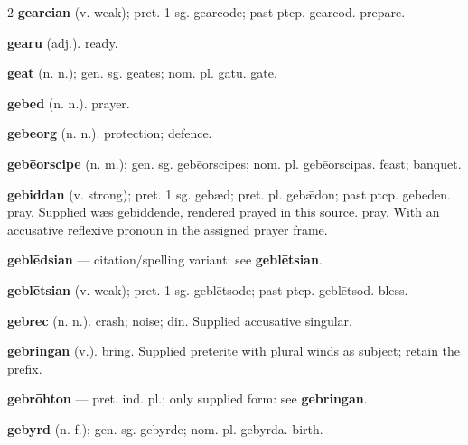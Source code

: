 \begin{multicols*}{2}
\textbf{gearcian} (v. weak); pret. 1 sg. gearcode; past ptcp. gearcod. prepare.\par
\textbf{gearu} (adj.). ready.\par
\textbf{geat} (n. n.); gen. sg. geates; nom. pl. gatu. gate.\par
\textbf{gebed} (n. n.). prayer.\par
\textbf{gebeorg} (n. n.). protection; defence.\par
\textbf{gebēorscipe} (n. m.); gen. sg. gebēorscipes; nom. pl. gebēorscipas. feast; banquet.\par
\textbf{gebiddan} (v. strong); pret. 1 sg. gebæd; pret. pl. gebǣdon; past ptcp. gebeden. pray. Supplied wæs gebiddende, rendered prayed in this source. pray. With an accusative reflexive pronoun in the assigned prayer frame.\par
\textbf{geblēdsian} — citation/spelling variant: see \textbf{geblētsian}.\par
\textbf{geblētsian} (v. weak); pret. 1 sg. geblētsode; past ptcp. geblētsod. bless.\par
\textbf{gebrec} (n. n.). crash; noise; din. Supplied accusative singular.\par
\textbf{gebringan} (v.). bring. Supplied preterite with plural winds as subject; retain the prefix.\par
\textbf{gebrōhton} — pret. ind. pl.; only supplied form: see \textbf{gebringan}.\par
\textbf{gebyrd} (n. f.); gen. sg. gebyrde; nom. pl. gebyrda. birth.\par

\end{multicols*}
